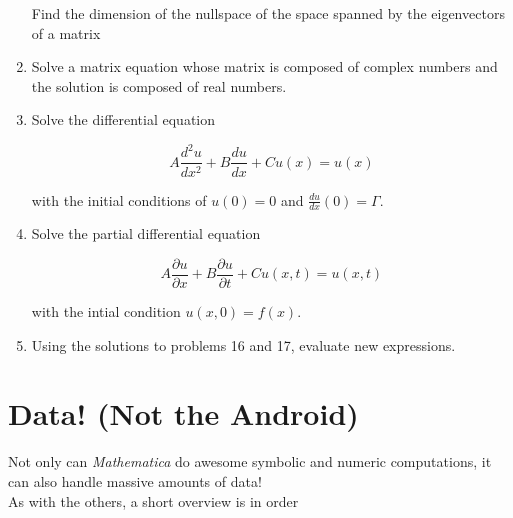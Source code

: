 \documentclass[11pt,letterpaper,twoside,titlepage]{report}
\newcommand{\Mathematica}{\textit{Mathematica} }
\begin{document}
\begin{enumerate}
					Find the dimension of the nullspace of the space spanned by the eigenvectors of a matrix
					
				\item %
				
					Solve a matrix equation whose matrix is composed of complex numbers and the solution is composed of real numbers.
					
				\item %
				
					Solve the differential equation 
					
					\[ A \frac{d^2 u}{d x^2} + B \frac{d u}{d x} + C u(x) = u(x) \]
					
					with the initial conditions of $u(0) = 0$ and $\frac{du}{dx}(0) = \Gamma $.
					
				\item %
				
					Solve the partial differential equation
					
					\[ A \frac{\partial u}{\partial x} + B \frac{\partial u}{\partial t} + C u(x,t) = u(x,t) \]
					
					with the intial condition $ u(x,0) = f(x) $.
					
				\item %
				
					Using the solutions to problems 16 and 17, evaluate new expressions.
			
			\end{enumerate}
				
	\part{Data! (Not the Android)}
	
		Not only can \Mathematica do awesome symbolic and numeric computations, it can also handle massive amounts of data! \\
		
		As with the others, a short overview is in order
		
\end{document}
